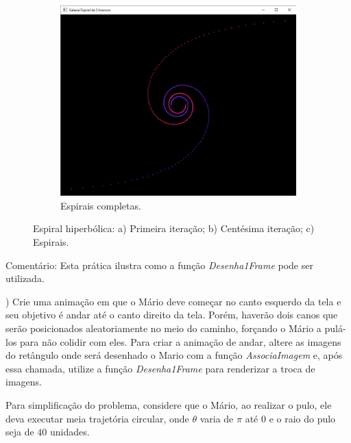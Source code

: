 \begin{renumerate}
\begin{figure}[!htp]
\begin{subfigure}[t]{0.3\textwidth}
        \centerline{\includegraphics[width=.9\textwidth]{img/cap1_ex6c}}
        \caption{Espirais completas.}
        \label{fig:cap01_ex6c}
    \end{subfigure}
    \caption{Espiral hiperbólica: a) Primeira iteração; b) Centésima iteração; c) Espirais.}

\end{figure}
  Comentário: Esta prática ilustra como a função \emph{Desenha1Frame} pode ser utilizada. 
%


  \item)
  Crie uma animação em que o Mário deve começar no canto esquerdo da tela e seu objetivo é andar até o canto direito da tela. Porém, haverão dois canos que serão posicionados aleatoriamente no meio do caminho, forçando o Mário a pulá-los para não colidir com eles. 
  Para criar a animação de andar, altere as imagens do retângulo onde será desenhado o Mario com a função \emph{AssociaImagem} e, após essa chamada, utilize a função \emph{Desenha1Frame} para renderizar a troca de imagens.

  Para simplificação do problema, considere que o Mário, ao realizar o pulo, ele deva executar meia trajetória circular, onde $\theta$ varia de $\pi$ até $0$ e o raio do pulo seja de $40$ unidades.
  \label{ex:cap01_ex25}


\end{renumerate}
